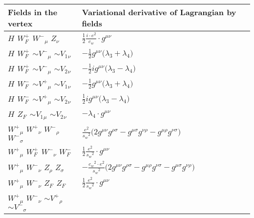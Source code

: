 \begin{center}
\begin{tabular}{|l|l|} \hline
Fields in the vertex & Variational derivative of Lagrangian by fields \\ \hline
${H}_{}$ \phantom{-} $W^+_F{}_{}$ \phantom{-} $W^-{}_{\mu }$ \phantom{-} ${Z}_{\nu }$ \phantom{-}  &
	$\frac{1}{2}\frac{ i \cdot e{}^2 }{ c_w}\cdot g^{\mu \nu} $\\[2mm]
${H}_{}$ \phantom{-} $W^+_F{}_{}$ \phantom{-} $\sim V^-{}_{\mu }$ \phantom{-} $\sim V_1{}_{\nu }$ \phantom{-}  &
	$-\frac{1}{2}g^{\mu \nu} \big( \lambda_3+ \lambda_4\big)$\\[2mm]
${H}_{}$ \phantom{-} $W^+_F{}_{}$ \phantom{-} $\sim V^-{}_{\mu }$ \phantom{-} $\sim V_2{}_{\nu }$ \phantom{-}  &
	$-\frac{1}{2} ig^{\mu \nu} \big( \lambda_3- \lambda_4\big)$\\[2mm]
${H}_{}$ \phantom{-} $W^-_F{}_{}$ \phantom{-} $\sim V^+{}_{\mu }$ \phantom{-} $\sim V_1{}_{\nu }$ \phantom{-}  &
	$-\frac{1}{2}g^{\mu \nu} \big( \lambda_3+ \lambda_4\big)$\\[2mm]
${H}_{}$ \phantom{-} $W^-_F{}_{}$ \phantom{-} $\sim V^+{}_{\mu }$ \phantom{-} $\sim V_2{}_{\nu }$ \phantom{-}  &
	$\frac{1}{2} ig^{\mu \nu} \big( \lambda_3- \lambda_4\big)$\\[2mm]
${H}_{}$ \phantom{-} $Z_F{}_{}$ \phantom{-} $\sim V_1{}_{\mu }$ \phantom{-} $\sim V_2{}_{\nu }$ \phantom{-}  &
	$- \lambda_4\cdot g^{\mu \nu} $\\[2mm]
$W^+{}_{\mu }$ \phantom{-} $W^+{}_{\nu }$ \phantom{-} $W^-{}_{\rho }$ \phantom{-} $W^-{}_{\sigma }$ \phantom{-}  &
	$\frac{ e{}^2 }{ s_w{}^2 }\big(2g^{\mu \nu} g^{\rho \sigma} -g^{\mu \sigma} g^{\nu \rho} -g^{\mu \rho} g^{\nu \sigma} \big)$\\[2mm]
$W^+{}_{\mu }$ \phantom{-} $W^+_F{}_{}$ \phantom{-} $W^-{}_{\nu }$ \phantom{-} $W^-_F{}_{}$ \phantom{-}  &
	$\frac{1}{2}\frac{ e{}^2 }{ s_w{}^2 }\cdot g^{\mu \nu} $\\[2mm]
$W^+{}_{\mu }$ \phantom{-} $W^-{}_{\nu }$ \phantom{-} ${Z}_{\rho }$ \phantom{-} ${Z}_{\sigma }$ \phantom{-}  &
	$-\frac{ c_w{}^2  \cdot e{}^2 }{ s_w{}^2 }\big(2g^{\mu \nu} g^{\rho \sigma} -g^{\mu \rho} g^{\nu \sigma} -g^{\mu \sigma} g^{\nu \rho} \big)$\\[2mm]
$W^+{}_{\mu }$ \phantom{-} $W^-{}_{\nu }$ \phantom{-} $Z_F{}_{}$ \phantom{-} $Z_F{}_{}$ \phantom{-}  &
	$\frac{1}{2}\frac{ e{}^2 }{ s_w{}^2 }\cdot g^{\mu \nu} $\\[2mm]
$W^+{}_{\mu }$ \phantom{-} $W^-{}_{\nu }$ \phantom{-} $\sim V^+{}_{\rho }$ \phantom{-} $\sim V^-{}_{\sigma }$ \phantom{-}  &

\end{tabular}
\end{center}
